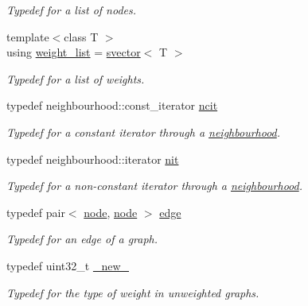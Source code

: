 \begin{DoxyCompactItemize}
\begin{DoxyCompactList}\small\item\em Typedef for a list of nodes. \end{DoxyCompactList}\item 
{\footnotesize template$<$class T $>$ }\\using \hyperlink{namespacelgraph_1_1utils_a11e7963f3637ea13778b8d3e69d2c17f}{weight\+\_\+list} = \hyperlink{classlgraph_1_1utils_1_1svector}{svector}$<$ T $>$\hypertarget{namespacelgraph_1_1utils_a11e7963f3637ea13778b8d3e69d2c17f}{}\label{namespacelgraph_1_1utils_a11e7963f3637ea13778b8d3e69d2c17f}

\begin{DoxyCompactList}\small\item\em Typedef for a list of weights. \end{DoxyCompactList}\item 
typedef neighbourhood\+::const\+\_\+iterator \hyperlink{namespacelgraph_1_1utils_a7207b078932845778282f5e2e373575b}{ncit}\hypertarget{namespacelgraph_1_1utils_a7207b078932845778282f5e2e373575b}{}\label{namespacelgraph_1_1utils_a7207b078932845778282f5e2e373575b}

\begin{DoxyCompactList}\small\item\em Typedef for a constant iterator through a \hyperlink{namespacelgraph_1_1utils_a0f2ef47028a466d26841709e705390ac}{neighbourhood}. \end{DoxyCompactList}\item 
typedef neighbourhood\+::iterator \hyperlink{namespacelgraph_1_1utils_af5daf6fe356a9014746bdb507787ae01}{nit}\hypertarget{namespacelgraph_1_1utils_af5daf6fe356a9014746bdb507787ae01}{}\label{namespacelgraph_1_1utils_af5daf6fe356a9014746bdb507787ae01}

\begin{DoxyCompactList}\small\item\em Typedef for a non-\/constant iterator through a \hyperlink{namespacelgraph_1_1utils_a0f2ef47028a466d26841709e705390ac}{neighbourhood}. \end{DoxyCompactList}\item 
typedef pair$<$ \hyperlink{namespacelgraph_1_1utils_a7bd66ede3805ef121bc2835bd48de0cf}{node}, \hyperlink{namespacelgraph_1_1utils_a7bd66ede3805ef121bc2835bd48de0cf}{node} $>$ \hyperlink{namespacelgraph_1_1utils_a6510284ce1b1ae5dc97ce5d2de426e10}{edge}\hypertarget{namespacelgraph_1_1utils_a6510284ce1b1ae5dc97ce5d2de426e10}{}\label{namespacelgraph_1_1utils_a6510284ce1b1ae5dc97ce5d2de426e10}

\begin{DoxyCompactList}\small\item\em Typedef for an edge of a graph. \end{DoxyCompactList}\item 
typedef uint32\+\_\+t \hyperlink{namespacelgraph_1_1utils_a2c84bfde888c42ab3ad6b2cb8a364240}{\+\_\+new\+\_\+}
\begin{DoxyCompactList}\small\item\em Typedef for the type of weight in unweighted graphs. \end{DoxyCompactList}\end{DoxyCompactItemize}
